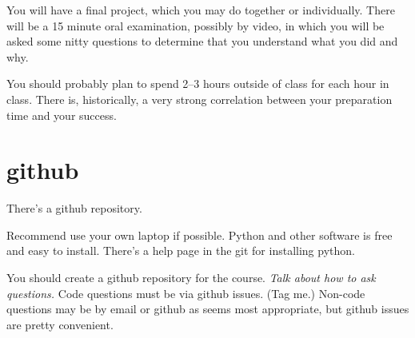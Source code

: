You will have a final project, which you may do together or
individually.  There will be a 15 minute oral examination, possibly by
video, in which you will be asked some nitty questions to determine
that you understand what you did and why.

You should probably plan to spend 2--3 hours outside of class for each
hour in class.  There is, historically, a very strong correlation
between your preparation time and your success.


\section*{github}

There's a github repository.

Recommend use your own laptop if possible.  Python and other software
is free and easy to install.  There's a help page in the git for
installing python.

You should create a github repository for the course.  \textit{Talk
  about how to ask questions.}  Code questions must be via github
issues.  (Tag me.)  Non-code questions may be by email or github as
seems most appropriate, but github issues are pretty convenient.


